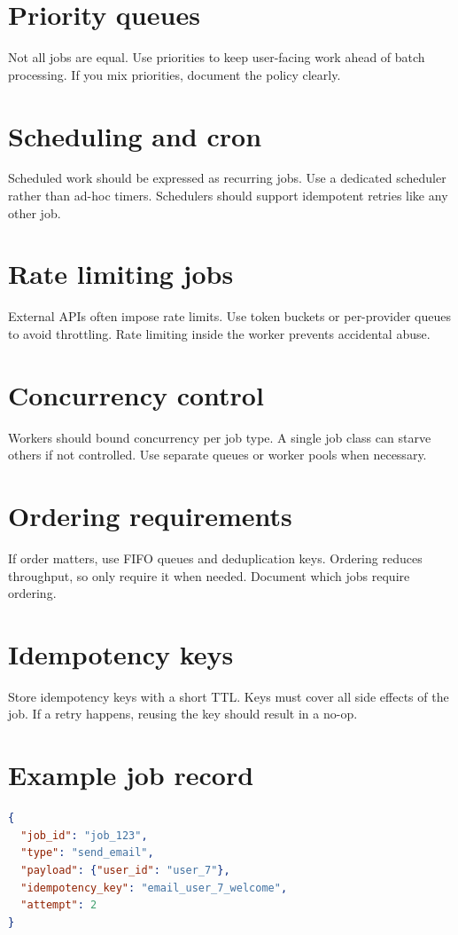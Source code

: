 \section{Priority queues}
Not all jobs are equal.
Use priorities to keep user-facing work ahead of batch processing.
If you mix priorities, document the policy clearly.

\section{Scheduling and cron}
Scheduled work should be expressed as recurring jobs.
Use a dedicated scheduler rather than ad-hoc timers.
Schedulers should support idempotent retries like any other job.

\section{Rate limiting jobs}
External APIs often impose rate limits.
Use token buckets or per-provider queues to avoid throttling.
Rate limiting inside the worker prevents accidental abuse.

\section{Concurrency control}
Workers should bound concurrency per job type.
A single job class can starve others if not controlled.
Use separate queues or worker pools when necessary.

\section{Ordering requirements}
If order matters, use FIFO queues and deduplication keys.
Ordering reduces throughput, so only require it when needed.
Document which jobs require ordering.

\section{Idempotency keys}
Store idempotency keys with a short TTL.
Keys must cover all side effects of the job.
If a retry happens, reusing the key should result in a no-op.

\section{Example job record}
\begin{lstlisting}[language=JSON]
{
  "job_id": "job_123",
  "type": "send_email",
  "payload": {"user_id": "user_7"},
  "idempotency_key": "email_user_7_welcome",
  "attempt": 2
}
\end{lstlisting}

